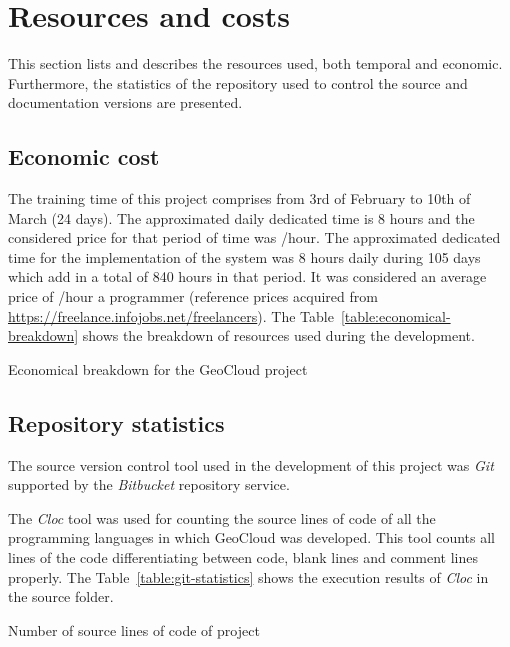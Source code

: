 \section{Resources and costs}

This section lists and describes the resources used, both temporal 
and economic. Furthermore, the
statistics of the repository used to control the source and documentation versions are presented.

\subsection{Economic cost}

The training time of this project comprises from 3rd of February to 10th of
March (24 days). The approximated daily dedicated time is 8 hours and the
considered price for that period of time was /hour. The approximated
dedicated time for the implementation of the system was 8 hours daily
during 105 days which add in a total of 840 hours in that period. It was considered an average
price of /hour a programmer (reference prices acquired from
\url{https://freelance.infojobs.net/freelancers}). The Table~\ref{table:economical-breakdown} shows the breakdown of resources used during the development.


\begin{table}[hp]
  \centering
  {\small
  
  }
  \caption{Economical breakdown for the GeoCloud project}
  \label{table:economical-breakdown}
\end{table}

\subsection{Repository statistics}

The source version control tool used in the development of this project was \emph{Git}
supported by the \emph{Bitbucket} repository service.

The \emph{Cloc} tool was used for counting the source lines of code of all the
programming languages in which
GeoCloud was developed. This tool counts all lines of the code differentiating
between code, blank lines and comment lines properly. The Table~\ref{table:git-statistics} shows the
execution results of \emph{Cloc} in the source folder.

\begin{table}[hp]
  \centering
  {\small
  
  }
  \caption{Number of source lines of code of project}
  \label{table:git-statistics}
\end{table}
